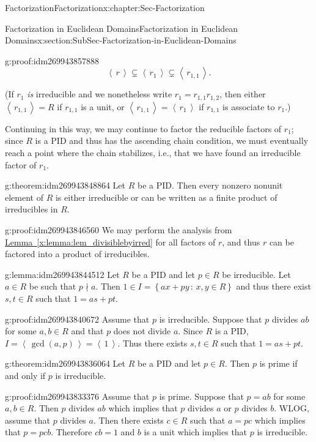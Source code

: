 \documentclass[oneside,10pt,]{book}
\numberwithin{equation}{section}
\newcommand{\ideal}[1]{\left\langle\, #1 \,\right\rangle}
\newcommand{\setof}[2]{{\left\{#1\,\colon\,#2\right\}}}
\begin{document}
\begin{chapterptx}{Factorization}{}{Factorization}{}{}{x:chapter:Sec-Factorization}
\begin{sectionptx}{Factorization in Euclidean Domains}{}{Factorization in Euclidean Domains}{}{}{x:section:SubSec-Factorization-in-Euclidean-Domains}
\begin{proofptx}{}{g:proof:idm269943857888}
\begin{equation*}
\ideal{r} \subsetneq \ideal{r_1}\subsetneq \ideal{r_{1,1}}\text{.}
\end{equation*}
%
\par
(If \(r_1\) \emph{is} irreducible and we nonetheless write \(r_1 = r_{1,1} r_{1,2}\), then either \(\ideal{r_{1,1}} = R\) if \(r_{1,1}\) is a unit, or \(\ideal{r_{1,1}} = \ideal{r_1}\) if \(r_{1,1}\) is associate to \(r_1\).)%
\par
Continuing in this way, we may continue to factor the reducible factors of \(r_1\); since \(R\) is a PID and thus has the ascending chain condition, we must eventually reach a point where the chain stabilizes, i.e., that we have found an irreducible factor of \(r_1\).%
\end{proofptx}
\begin{theorem}{}{}{g:theorem:idm269943848864}%
Let \(R\) be a PID. Then every nonzero nonunit element of \(R\) is either irreducible or can be written as a finite product of irreducibles in \(R\).%
\end{theorem}
\begin{proofptx}{}{g:proof:idm269943846560}
We may perform the analysis from \hyperref[x:lemma:lem_divisiblebyirred]{Lemma~\ref{x:lemma:lem_divisiblebyirred}} for all factors of \(r\), and thus \(r\) can be factored into a product of irreducibles.%
\end{proofptx}
\begin{lemma}{}{}{g:lemma:idm269943844512}%
Let \(R\) be a PID and let \(p\in R\) be irreducible. Let \(a\in R\) be such that \(p\nmid a\). Then \(1\in I = \setof{ax+py}{x,y\in R}\) and thus there exist \(s,t\in R\) such that \(1 = as+pt\).%
\end{lemma}
\begin{proofptx}{}{g:proof:idm269943840672}
Assume that \(p\) is irreducible. Suppose that \(p\) divides \(ab\) for some \(a,b \in R\) and that \(p\) does not divide \(a\). Since \(R\) is a PID, \(I = \ideal{\gcd(a,p)} = \ideal{1}\). Thus there exists \(s,t\in R\) such that \(1=as+pt\).%
\end{proofptx}
\begin{theorem}{}{}{g:theorem:idm269943836064}%
Let \(R\) be a PID and let \(p\in R\). Then \(p\) is prime if and only if \(p\) is irreducible.%
\end{theorem}
\begin{proofptx}{}{g:proof:idm269943833376}
Assume that \(p\) is prime. Suppose that \(p=ab\) for some \(a,b \in R\). Then \(p\) divides \(ab\) which implies that \(p\) divides \(a\) or \(p\) divides \(b\). WLOG, assume that \(p\) divides \(a\). Then there exists \(c\in R\) such that \(a=pc\) which implies that \(p=pcb\). Therefore \(cb=1\) and \(b\) is a unit which implies that \(p\) is irreducible.%

\end{proofptx}
\end{sectionptx}
\end{chapterptx}
\end{document}
